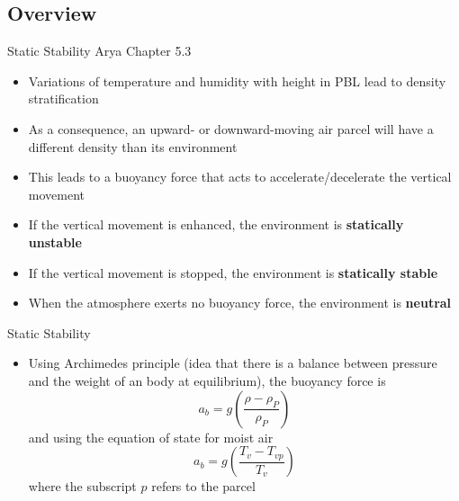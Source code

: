 \subsection{Overview}
\begin{frame}{Static Stability}
Arya Chapter 5.3
\begin{itemize}
	\item Variations of temperature and humidity with height in PBL lead to density stratification
	\item As a consequence, an upward- or downward-moving air parcel will have a different density than its environment
	\item This leads to a buoyancy force that acts to accelerate/decelerate the vertical movement
	\item If the vertical movement is enhanced, the environment is \textbf{statically unstable}
	\item If the vertical movement is stopped, the environment is \textbf{statically stable}
	\item When the atmosphere exerts no buoyancy force, the environment is \textbf{neutral}
\end{itemize}
\end{frame}
\begin{frame}{Static Stability}
\begin{itemize}
	\item Using Archimedes principle (idea that there is a balance between pressure and the weight of an body at equilibrium), the buoyancy force is
	$$a_b=g\left(\frac{\rho - \rho_P}{\rho_P}\right)$$
	and using the equation of state for moist air
	$$a_b=g\left(\frac{T_v - T_{vp}}{T_v}\right)$$
	where the subscript $p$ refers to the parcel
\end{itemize}
\end{frame}

